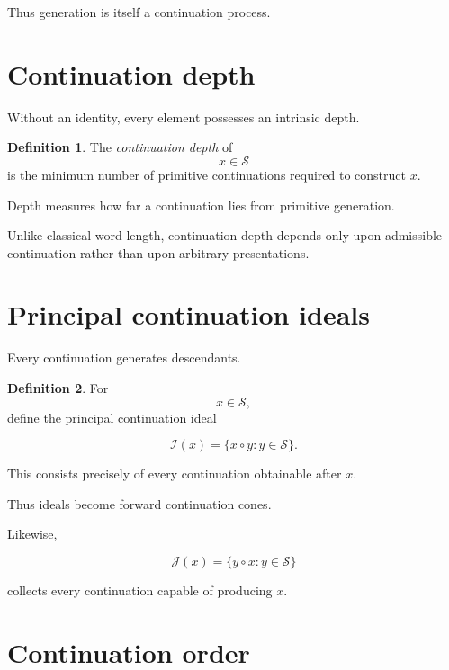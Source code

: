 \documentclass[13pt,openany]{book}
\theoremstyle{plain}
\theoremstyle{definition}
\newtheorem{definition}{Definition}[chapter]
\begin{document}
Thus generation is itself a continuation process.

\section{Continuation depth}

Without an identity, every element possesses an intrinsic depth.

\begin{definition}
The \emph{continuation depth} of
\[
x\in\mathcal S
\]
is the minimum number of primitive continuations required to construct $x$.
\end{definition}

Depth measures how far a continuation lies from primitive generation.

Unlike classical word length, continuation depth depends only upon admissible
continuation rather than upon arbitrary presentations.

\section{Principal continuation ideals}

Every continuation generates descendants.

\begin{definition}
For
\[
x\in\mathcal S,
\]
define the principal continuation ideal

\[
\mathcal I(x)
=
\{x\circ y:y\in\mathcal S\}.
\]
\end{definition}

This consists precisely of every continuation obtainable after $x$.

Thus ideals become forward continuation cones.

Likewise,

\[
\mathcal J(x)
=
\{y\circ x:y\in\mathcal S\}
\]

collects every continuation capable of producing $x$.

\section{Continuation order}
\end{document}
